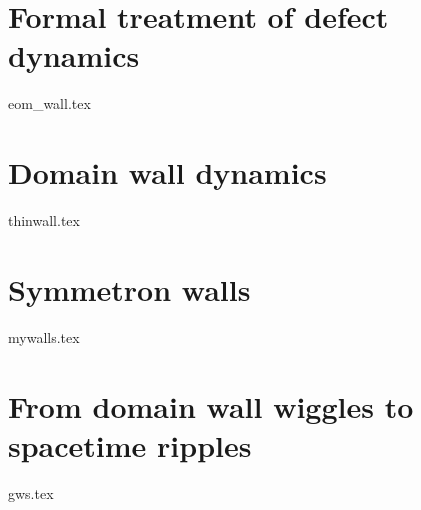 \section{Formal treatment of defect dynamics}\label{sec:pertwalls:eom_wall}
    {{eom_wall.tex}}

\section{Domain wall dynamics}\label{sec:pertwalls:thinwall}
    {{thinwall.tex}}

\section{Symmetron walls}\label{sec:pertwalls:mywalls}
    {{mywalls.tex}}

\section{From domain wall wiggles to spacetime ripples}\label{sec:pertwalls:gws}
    {{gws.tex}}




